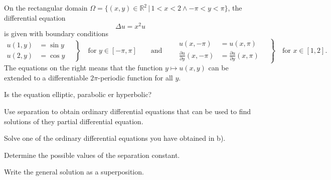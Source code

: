 On the rectangular domain
$\Omega = \{(x,y)\in\mathbb R^2\,|\, 1<x<2\wedge -\pi<y<\pi\}$,
the differential equation
\begin{equation}
\Delta u = x^2u
\label{40000025:eqn}
\end{equation}
is given with boundary conditions
\begin{equation}
\left.
\begin{aligned}
u(1,y) &= \sin y\\
u(2,y) &= \cos y
\end{aligned}
\quad
\right\}
\quad
\text{for $y\in[-\pi,\pi]$}
\qquad
\text{and}
\qquad
\left.
\begin{aligned}
u(x,-\pi) &= u(x,\pi)\\
\frac{\partial u}{\partial y}(x,-\pi) &= \frac{\partial u}{\partial y}(x,\pi)
\end{aligned}
\quad\right\}
\quad
\text{for $x\in[1,2]$.}
\end{equation}
The equations on the right means that the function $y\mapsto u(x,y)$
can be extended to a differentiable $2\pi$-periodic function for all $y$.

\begin{teilaufgaben}
\item
Is the equation elliptic, parabolic er hyperbolic?
\item
Use separation to obtain ordinary differential equations that can be
used to find solutions of they partial differential equation.
\item
Solve one of the ordinary differential equations you have obtained in b).
\item
Determine the possible values of the separation constant.
\item
Write the general solution as a superposition.
\end{teilaufgaben}

